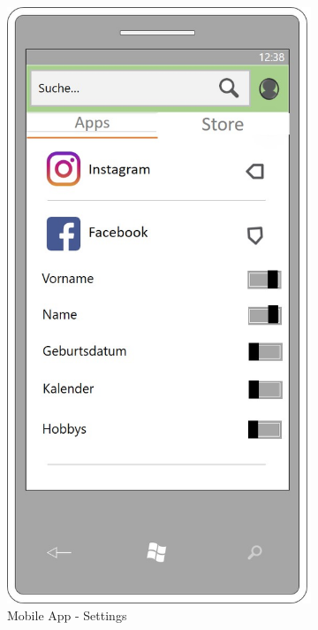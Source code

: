 \begin{figure}[!ht]
	\begin{subfigure}{0.32\linewidth}
		\centering
		\includegraphics[width=1\linewidth]{Picture/App-Settings}
		\caption{Mobile App - Settings}
		\label{fig:prototyp2}
	\end{subfigure}
	\begin{subfigure}{0.32\linewidth}

\end{subfigure}
\end{figure}
